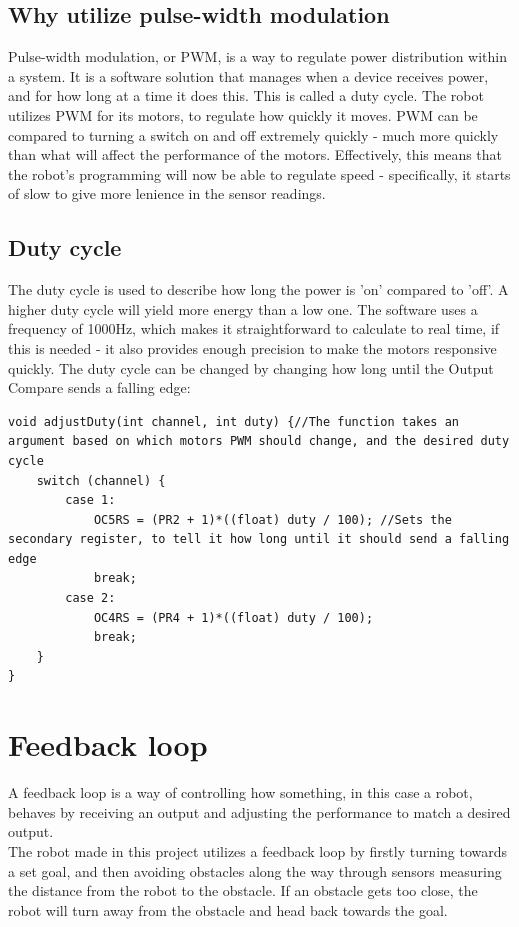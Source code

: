 \subsection {Why utilize pulse-width modulation}

Pulse-width modulation, or PWM, is a way to regulate power distribution within a system. It is a software solution that manages when a device receives power, and for how long at a time it does this. This is called a duty cycle. The robot utilizes PWM for its motors, to regulate how quickly it moves. PWM can be compared to turning a switch on and off extremely quickly - much more quickly than what will affect the performance of the motors. Effectively, this means that the robot's programming will now be able to regulate speed - specifically, it starts of slow to give more lenience in the sensor readings. 
 
\subsection {Duty cycle}

The duty cycle is used to describe how long the power is 'on' compared to 'off'. A higher duty cycle will yield more energy than a low one. The software uses a frequency of 1000Hz, which makes it straightforward to calculate to real time, if this is needed - it also provides enough precision to make the motors responsive quickly.
The duty cycle can be changed by changing how long until the Output Compare sends a falling edge:

\begin{lstlisting}
void adjustDuty(int channel, int duty) {//The function takes an argument based on which motors PWM should change, and the desired duty cycle
    switch (channel) { 
        case 1:
            OC5RS = (PR2 + 1)*((float) duty / 100); //Sets the secondary register, to tell it how long until it should send a falling edge
            break;
        case 2:
            OC4RS = (PR4 + 1)*((float) duty / 100);
            break;
    }
}
\end{lstlisting}

\section{Feedback loop}
A feedback loop is a way of controlling how something, in this case a robot, behaves by receiving an output and adjusting the performance to match a desired output.\\
The robot made in this project utilizes a feedback loop by firstly turning towards a set goal, and then avoiding obstacles along the way through sensors measuring the distance from the robot to the obstacle. If an obstacle gets too close, the robot will turn away from the obstacle and head back towards the goal.
